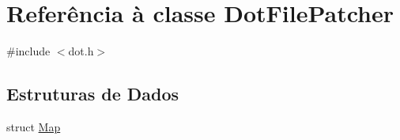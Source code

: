 \hypertarget{class_dot_file_patcher}{\section{Referência à classe Dot\-File\-Patcher}
\label{class_dot_file_patcher}
}


{\ttfamily \#include $<$dot.\-h$>$}

\subsection*{Estruturas de Dados}
\begin{DoxyCompactItemize}
\item 
struct \hyperlink{struct_dot_file_patcher_1_1_map}{Map}
\end{DoxyCompactItemize}
